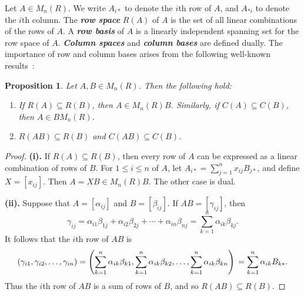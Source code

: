 \documentclass[11pt]{article}
\newtheorem{prop}[thm]{Proposition}
\newcommand{\defn}[1]{\textbf{\textit{#1}}}
\numberwithin{equation}{section}
\begin{document}
Let $A \in M_n(R)$. We write $A_{i*}$ to denote the $i$th row of $A$, and
$A_{*i}$ to denote the $i$th column. The \defn{row space} $R(A)$ of $A$ is the
set of all linear combinations of the rows of $A$. A \defn{row basis} of $A$ is
a linearly independent spanning set for the row space of $A$. \defn{Column
  spaces} and \defn{column bases} are defined dually. The importance of row and
column bases arises from the following well-known results~\cite{TODO}:

\begin{prop}
  Let $A, B \in M_n(R)$. Then the following hold:
  \begin{enumerate}[label=\roman*]

    \item
      If $R(A) \subseteq R(B)$, then $A \in M_n(R) B$.  Similarly, if $C(A)
      \subseteq C(B)$, then $A \in B M_n(R)$.

    \item 
      $R(AB) \subseteq R(B)$ and $C(AB) \subseteq C(B)$.
  \end{enumerate}
\end{prop}
\begin{proof}
  \noindent \textbf{(i).}
  If $R(A) \subseteq R(B)$, then every row of $A$ can be expressed as a linear
  combination of rows of $B$. For $1 \leq i \leq n$ of $A$, let $A_{i*} =
  \sum_{j = 1}^{n}x_{ij}B_{j*}$, and define $X = [x_{ij}]$. Then $A = XB \in
  M_n(R)B$. The other case is dual.
  \bigskip

  \noindent \textbf{(ii).}
  Suppose that $A = [\alpha_{ij}]$ and $B = [\beta_{ij}]$. If 
  $AB = [\gamma_{ij}]$, then 
  \[
  \gamma_{ij} = \alpha_{i1} \beta_{1j} + \alpha_{i2}\beta_{2j} 
                + \cdots + \alpha_{in}\beta_{nj}
              = \sum_{k = 1} ^ {n} \alpha_{ik}\beta_{kj}.
  \]
  It follows that the $i$th row of $AB$ is 
  \[
  (\gamma_{i1}, \gamma_{i2}, \ldots, \gamma_{in})
   =  \left (\sum_{k = 1} ^ {n} \alpha_{ik}\beta_{k1},
     \sum_{k = 1} ^ {n} \alpha_{ik}\beta_{k2},
     \ldots, 
     \sum_{k = 1} ^ {n} \alpha_{ik}\beta_{kn}\right) \\
    =
    \sum_{k = 1} ^ {n} 
    \alpha_{ik}B_{k*}.
  \]
  Thus the $i$th row of $AB$ is a sum of rows of $B$, and so $R(AB) \subseteq
  R(B)$. 
\end{proof}
\end{document}
